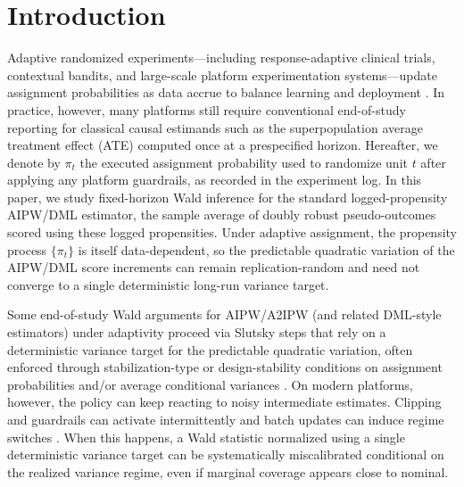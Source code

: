 \documentclass[11pt]{article}
\numberwithin{equation}{section}
\theoremstyle{plain}
\theoremstyle{definition}
\theoremstyle{remark}
\begin{document}
\newpage



\section{Introduction}\label{sec:intro}

Adaptive randomized experiments---including response-adaptive clinical trials, contextual bandits, and large-scale platform experimentation systems---update assignment probabilities as data accrue to balance learning and deployment \citep{kasySautmann2021,zhang2020large}. In practice, however, many platforms still require conventional end-of-study reporting for classical causal estimands such as the superpopulation average treatment effect (ATE) computed once at a prespecified horizon. Hereafter, we denote by $\pi_t$ the executed assignment probability used to randomize unit $t$ after applying any platform guardrails, as recorded in the experiment log. In this paper, we study fixed-horizon Wald inference for the standard logged-propensity AIPW/DML estimator, the sample average of doubly robust pseudo-outcomes scored using these logged propensities. Under adaptive assignment, the propensity process $\{\pi_t\}$ is itself data-dependent, so the predictable quadratic variation of the AIPW/DML score increments can remain replication-random and need not converge to a single deterministic long-run variance target.

Some end-of-study Wald arguments for AIPW/A2IPW (and related DML-style estimators) under adaptivity proceed via Slutsky steps that rely on a deterministic variance target for the predictable quadratic variation, often enforced through stabilization-type or design-stability conditions on assignment probabilities and/or average conditional variances \citep{hadad2021confidence,zhan2021off,katoIshiharaHondaNarita2020,cook2024semiparametric,LiOwen2024,sengupta2025designstability}. On modern platforms, however, the policy can keep reacting to noisy intermediate estimates. Clipping and guardrails can activate intermittently and batch updates can induce regime switches \citep{kasySautmann2021,zhang2020large}. When this happens, a Wald statistic normalized using a single deterministic variance target can be systematically miscalibrated conditional on the realized variance regime, even if marginal coverage appears close to nominal.
\end{document}
